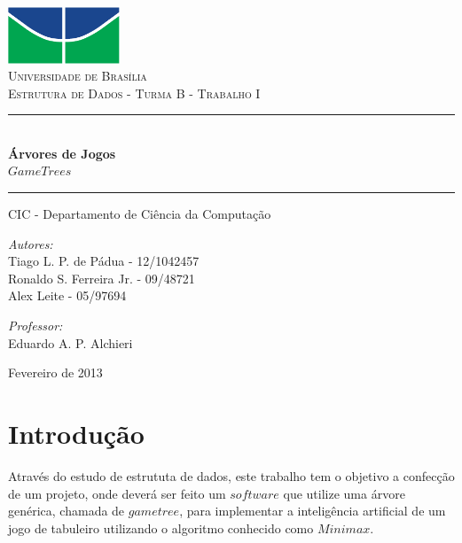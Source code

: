 \documentclass[a4paper,11pt]{article}
\newcommand{\HRule}{\rule{\linewidth}{0.5mm}}
\begin{document}
\begin{titlepage}
\begin{center}
 
\includegraphics[width=0.25\textwidth]{./unb.pdf}\\[1cm]
 
\textsc{\LARGE Universidade de Brasília}\\[1.5cm]
 
\textsc{\Large Estrutura de Dados - Turma B - Trabalho I}\\[0.5cm]
 
\HRule \\[0.4cm]
{ \huge \bfseries Árvores de Jogos\\$Game Trees$}
\HRule
\vspace{0.75cm}
\large CIC - Departamento de Ciência da Computação\\
\vspace{0.8cm}
\begin{minipage}{0.4\textwidth}
\begin{flushleft} \large
\emph{Autores:}\\
Tiago L. P. de Pádua - 12/1042457\\
Ronaldo S. Ferreira Jr. - 09/48721\\
Alex Leite - 05/97694\\
\end{flushleft}
\end{minipage}
\begin{minipage}{0.4\textwidth}
\begin{flushright} \large
\emph{Professor:} \\
Eduardo A. P. Alchieri
\end{flushright}
\end{minipage}
 
\vfill
 
{\large Fevereiro de 2013}
\end{center}
\end{titlepage}

\pagestyle{plain}

\section{Introdução} 
Através do estudo de estrututa de dados, este trabalho tem o objetivo a confecção de um projeto, onde deverá ser feito um $software$ que utilize uma  árvore genérica, chamada de $game tree$, para implementar a inteligência artificial de um jogo de tabuleiro utilizando o algoritmo conhecido como $Minimax$.
\end{document}
